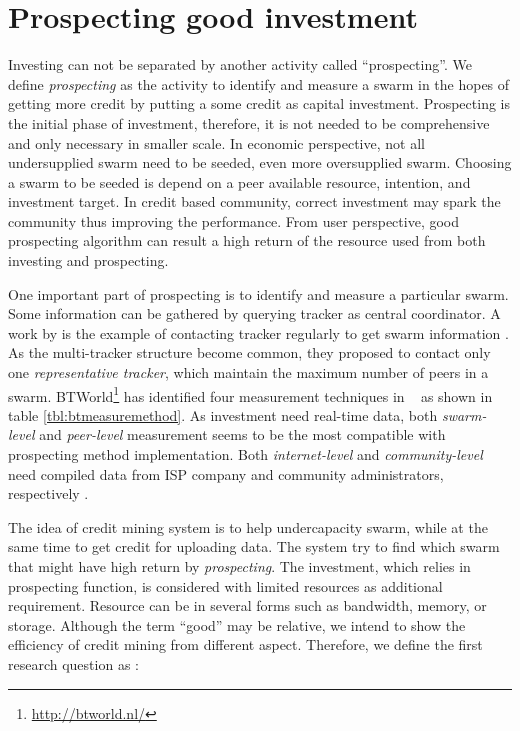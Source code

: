 \section{Prospecting good investment}

Investing can not be separated by another activity called ``prospecting''. We define \textit{prospecting} as the activity to identify and measure a swarm in the hopes of getting more credit by putting a some credit as capital investment. Prospecting is the initial phase of investment, therefore, it is not needed to be comprehensive and only necessary in smaller scale. In economic perspective, not all undersupplied swarm need to be seeded, even more oversupplied swarm. Choosing a swarm to be seeded is depend on a peer available resource, intention, and investment target. In credit based community, correct investment may spark the community thus improving the performance. From user perspective, good prospecting algorithm can result a high return of the resource used from both investing and prospecting.

One important part of prospecting is to identify and measure a particular swarm. Some information can be gathered by querying tracker as central coordinator. A work by \citeauthor{2011:yoshida:crawlbtnet} is the example of contacting tracker regularly to get swarm information \cite{2011:yoshida:crawlbtnet}. As the multi-tracker structure become common, they proposed to contact only one \textit{representative tracker}, which maintain the maximum number of peers in a swarm. BTWorld\footnote{\url{http://btworld.nl/}} has identified four measurement techniques in \bt~\cite{2010:btworld:wojciechowski} as shown in table \ref{tbl:btmeasuremethod}. As investment need real-time data, both \textit{swarm-level} and \textit{peer-level} measurement seems to be the most compatible with prospecting method implementation. Both \textit{internet-level} and \textit{community-level} need compiled data from ISP company and community administrators, respectively . 

The idea of credit mining system is to help undercapacity swarm, while at the same time to get credit for uploading data. The system try to find which swarm that might have high return by \textit{prospecting}. The investment, which relies in prospecting function, is considered with limited resources as additional requirement. Resource can be in several forms such as bandwidth, memory, or storage. Although the term ``good'' may be relative, we intend to show the efficiency of credit mining from different aspect. Therefore, we define the first research question as :

